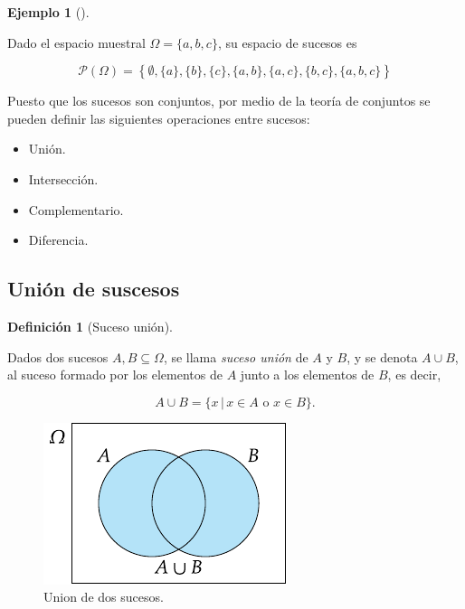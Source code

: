 \documentclass[
  a4paper,
]{scrreport}
\providecommand{\tightlist}{%
  \setlength{\itemsep}{0pt}\setlength{\parskip}{0pt}}\usepackage{longtable,booktabs,array}
\theoremstyle{plain}
\theoremstyle{definition}
\newtheorem{example}{Ejemplo}[chapter]
\theoremstyle{definition}
\newtheorem{definition}{Definición}[chapter]
\theoremstyle{remark}
\begin{document}
\begin{example}[]\protect\hypertarget{exm-espacio-sucesos}{}\label{exm-espacio-sucesos}

Dado el espacio muestral \(\Omega=\{a,b,c\}\), su espacio de sucesos es

\[\mathcal{P}(\Omega)=\left\{\emptyset, \{a\},\{b\},\{c\},\{a,b\},\{a,c\},\{b,c\},\{a,b,c\}\right\}\]

\end{example}

Puesto que los sucesos son conjuntos, por medio de la teoría de
conjuntos se pueden definir las siguientes operaciones entre sucesos:

\begin{itemize}
\tightlist
\item
  Unión.
\item
  Intersección.
\item
  Complementario.
\item
  Diferencia.
\end{itemize}

\subsection{Unión de suscesos}\label{uniuxf3n-de-suscesos}

\begin{definition}[Suceso
unión]\protect\hypertarget{def-union-sucesos}{}\label{def-union-sucesos}

Dados dos sucesos \(A,B\subseteq \Omega\), se llama \emph{suceso unión}
de \(A\) y \(B\), y se denota \(A\cup B\), al suceso formado por los
elementos de \(A\) junto a los elementos de \(B\), es decir,

\[A\cup B = \{x\,|\, x\in A\mbox{ o }x\in B\}.\]

\end{definition}

\begin{figure}[H]

{\centering \includegraphics{img/probabilidad/union.pdf}

}

\caption{Union de dos sucesos.}

\end{figure}%
\end{document}
